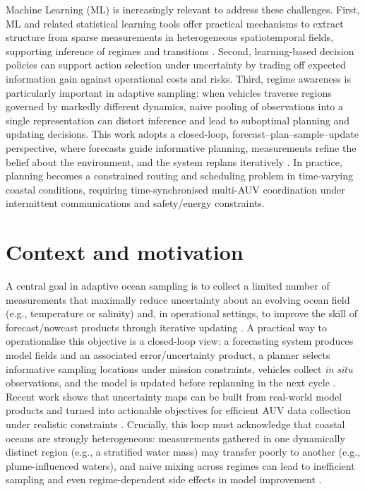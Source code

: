 Machine Learning (ML) is increasingly relevant to address these challenges. First, ML and related statistical learning
tools offer practical mechanisms to extract structure from sparse measurements in heterogeneous spatiotemporal fields,
supporting inference of regimes and transitions \cite{cressie2011spatiotemporal}. Second, learning-based decision
policies can support action selection under uncertainty by trading off expected information gain against operational
costs and risks. Third, regime awareness is particularly important in adaptive sampling: when vehicles traverse regions
governed by markedly different dynamics, naive pooling of observations into a single representation can distort
inference and lead to suboptimal planning and updating decisions. This work adopts a closed-loop,
forecast--plan--sample--update perspective, where forecasts guide informative planning, measurements refine the belief
about the environment, and the system replans iteratively \cite{curtin2009aosn}. In practice, planning becomes a
constrained routing and scheduling problem in time-varying coastal conditions, requiring time-synchronised multi-AUV
coordination under intermittent communications and safety/energy constraints.



\section{Context and motivation} \label{sec:context_motivation}

A central goal in adaptive ocean sampling is to collect a limited number of measurements that maximally reduce uncertainty
about an evolving ocean field (e.g., temperature or salinity) and, in operational settings, to improve the skill of
forecast/nowcast products through iterative updating \cite{bernacchi2025closingloop}. A practical way to operationalise
this objective is a closed-loop view: a forecasting system produces model fields and an associated error/uncertainty
product, a planner selects informative sampling locations under mission constraints, vehicles collect \emph{in situ}
observations, and the model is updated before replanning in the next cycle \cite{bernacchi2025closingloop}. Recent work
shows that uncertainty maps can be built from real-world model products and turned into actionable objectives for efficient
AUV data collection under realistic constraints \cite{duarte2025geostatistical}. Crucially, this loop must acknowledge
that coastal oceans are strongly heterogeneous: measurements gathered in one dynamically distinct region (e.g., a stratified
water mass) may transfer poorly to another (e.g., plume-influenced waters), and naive mixing across regimes can lead to
inefficient sampling and even regime-dependent side effects in model improvement \cite{mendes2025oceanmodeldriven}.

